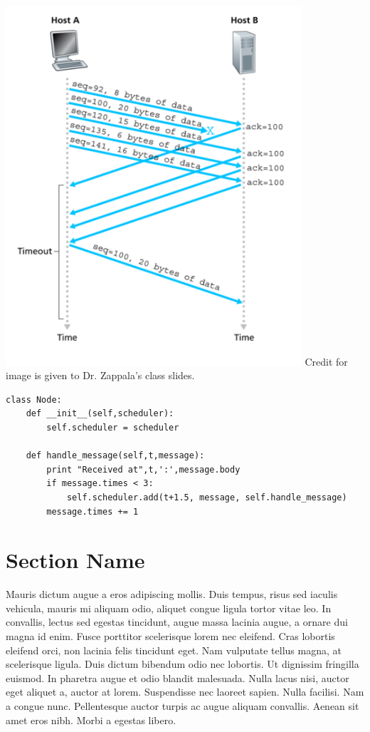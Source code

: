 \documentclass[11pt]{article}
\begin{document}
\includegraphics[width=11cm]{fast_transport.png}
Credit for image is given to Dr. Zappala's class slides.

\begin{lstlisting}
class Node:
    def __init__(self,scheduler):
        self.scheduler = scheduler

    def handle_message(self,t,message):
        print "Received at",t,':',message.body
        if message.times < 3:
            self.scheduler.add(t+1.5, message, self.handle_message)
        message.times += 1
\end{lstlisting}

\section{Section Name}

Mauris dictum augue a eros adipiscing mollis. Duis tempus, risus sed
iaculis vehicula, mauris mi aliquam odio, aliquet congue ligula tortor
vitae leo. In convallis, lectus sed egestas tincidunt, augue massa
lacinia augue, a ornare dui magna id enim. Fusce porttitor scelerisque
lorem nec eleifend. Cras lobortis eleifend orci, non lacinia felis
tincidunt eget. Nam vulputate tellus magna, at scelerisque
ligula. Duis dictum bibendum odio nec lobortis. Ut dignissim fringilla
euismod. In pharetra augue et odio blandit malesuada. Nulla lacus
nisi, auctor eget aliquet a, auctor at lorem. Suspendisse nec laoreet
sapien. Nulla facilisi. Nam a congue nunc. Pellentesque auctor turpis
ac augue aliquam convallis. Aenean sit amet eros nibh. Morbi a egestas
libero.
\end{document}
